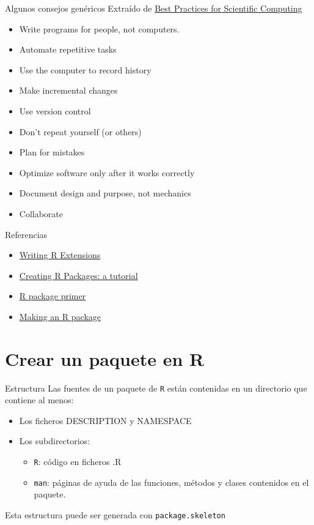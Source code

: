\documentclass[xcolor={usenames,svgnames,dvipsnames}]{beamer}
\begin{document}
\begin{frame}[label={sec:org897a871}]{Algunos consejos genéricos}
Extraído de \href{http://arxiv.org/abs/1210.0530}{Best Practices for Scientific Computing}

\begin{itemize}
\item Write programs for people, not computers.
\item Automate repetitive tasks
\item Use the computer to record history
\item Make incremental changes
\item Use version control
\item Don't repeat yourself (or others)
\item Plan for mistakes
\item Optimize software only after it works correctly
\item Document design and purpose, not mechanics
\item Collaborate
\end{itemize}
\end{frame}

\begin{frame}[label={sec:orgf8220eb}]{}
\begin{block}{Referencias}
\begin{itemize}
\item \href{http://cran.r-project.org/doc/manuals/r-release/R-exts.html}{Writing R Extensions}
\item \href{http://cran.r-project.org/doc/contrib/Leisch-CreatingPackages.pdf}{Creating R Packages: a tutorial}
\item \href{http://kbroman.org/pkg\_primer/}{R package primer}
\item \href{http://portal.stats.ox.ac.uk/userdata/ruth/APTS2012/Rcourse10.pdf}{Making an R package}
\end{itemize}
\end{block}
\end{frame}

\section{Crear un paquete en R}
\label{sec:orgbf96cbd}

\begin{frame}[label={sec:org8b8c81f},fragile]{Estructura}
 Las fuentes de un paquete de \texttt{R} están contenidas en un directorio que contiene al menos:
\begin{itemize}
\item Los ficheros DESCRIPTION y NAMESPACE
\item Los subdirectorios:
\begin{itemize}
\item \texttt{R}: código en ficheros .R
\item \texttt{man}: páginas de ayuda de las funciones, métodos y clases
contenidos en el paquete.
\end{itemize}
\end{itemize}
Esta estructura puede ser generada con \texttt{package.skeleton}
\end{frame}
\end{document}

